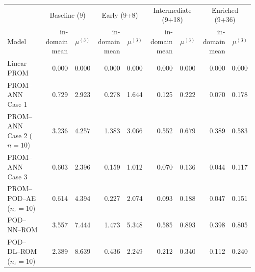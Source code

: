 \begin{tabular}{lrr|rr|rr|rr}
\toprule
& \multicolumn{2}{c|}{Baseline (9)} & \multicolumn{2}{c|}{Early (9+8)} & \multicolumn{2}{c|}{Intermediate (9+18)} & \multicolumn{2}{c}{Enriched (9+36)} \\
Model & \shortstack{in-domain\\mean} & $\mu^{(3)}$ & \shortstack{in-domain\\mean} & $\mu^{(3)}$ & \shortstack{in-domain\\mean} & $\mu^{(3)}$ & \shortstack{in-domain\\mean} & $\mu^{(3)}$ \\
\midrule
Linear PROM & 0.000 & 0.000 & 0.000 & 0.000 & 0.000 & 0.000 & 0.000 & 0.000 \\
PROM--ANN Case 1 & 0.729 & 2.923 & 0.278 & 1.644 & 0.125 & 0.222 & 0.070 & 0.178 \\
PROM--ANN Case 2 ($n=10$) & 3.236 & 4.257 & 1.383 & 3.066 & 0.552 & 0.679 & 0.389 & 0.583 \\
PROM--ANN Case 3 & 0.603 & 2.396 & 0.159 & 1.012 & 0.070 & 0.136 & 0.044 & 0.117 \\
PROM--POD--AE ($n_z=10$) & 0.614 & 4.394 & 0.227 & 2.074 & 0.093 & 0.188 & 0.047 & 0.151 \\
\midrule
POD--NN--ROM & 3.557 & 7.444 & 1.473 & 5.348 & 0.585 & 0.893 & 0.398 & 0.805 \\
POD--DL--ROM ($n_z=10$) & 2.389 & 8.639 & 0.436 & 2.249 & 0.212 & 0.340 & 0.112 & 0.240 \\
\bottomrule
\end{tabular}
